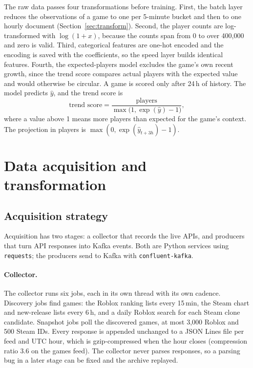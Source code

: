 \documentclass[10pt,a4paper]{article}
\newcommand{\ep}[1]{\texttt{\small #1}}
\begin{document}
The raw data passes four transformations before training. First, the batch layer reduces the observations of a game to one per 5-minute bucket and then to one hourly document (Section~\ref{sec:transform}). Second, the player counts are log-transformed with $\log(1+x)$, because the counts span from 0 to over 400,000 and zero is valid. Third, categorical features are one-hot encoded and the encoding is saved with the coefficients, so the speed layer builds identical features. Fourth, the expected-players model excludes the game's own recent growth, since the trend score compares actual players with the expected value and would otherwise be circular. A game is scored only after 24\,h of history. The model predicts $\widehat{y}$, and the trend score is
\[
\text{trend score} = \frac{\text{players}}{\max\bigl(1, \exp(\widehat{y})-1\bigr)},
\]
where a value above 1 means more players than expected for the game's context. The projection in players is $\max(0, \exp(\widehat{y}_{t+3h})-1)$.

\section{Data acquisition and transformation}\label{sec:acquisition}

\subsection{Acquisition strategy}\label{sec:acq-strategy}
Acquisition has two stages: a collector that records the live APIs, and producers that turn API responses into Kafka events. Both are Python services using \ep{requests}; the producers send to Kafka with \ep{confluent-kafka}.

\paragraph{Collector.} The collector runs six jobs, each in its own thread with its own cadence. Discovery jobs find games: the Roblox ranking lists every 15\,min, the Steam chart and new-release lists every 6\,h, and a daily Roblox search for each Steam clone candidate. Snapshot jobs poll the discovered games, at most 3,000 Roblox and 500 Steam IDs. Every response is appended unchanged to a JSON Lines file per feed and UTC hour, which is gzip-compressed when the hour closes (compression ratio 3.6 on the games feed). The collector never parses responses, so a parsing bug in a later stage can be fixed and the archive replayed.
\end{document}
